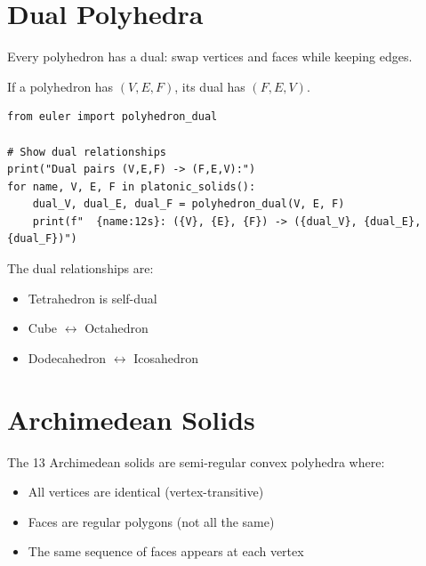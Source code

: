 \section{Dual Polyhedra}

Every polyhedron has a dual: swap vertices and faces while keeping edges.

\begin{theorem}
If a polyhedron has $(V, E, F)$, its dual has $(F, E, V)$.
\end{theorem}

\begin{lstlisting}[caption={Dual polyhedra}, label=lst:dual]
from euler import polyhedron_dual

# Show dual relationships
print("Dual pairs (V,E,F) -> (F,E,V):")
for name, V, E, F in platonic_solids():
    dual_V, dual_E, dual_F = polyhedron_dual(V, E, F)
    print(f"  {name:12s}: ({V}, {E}, {F}) -> ({dual_V}, {dual_E}, {dual_F})")
\end{lstlisting}

The dual relationships are:
\begin{itemize}
\item Tetrahedron is self-dual
\item Cube $\leftrightarrow$ Octahedron
\item Dodecahedron $\leftrightarrow$ Icosahedron
\end{itemize}

\section{Archimedean Solids}

The 13 Archimedean solids are semi-regular convex polyhedra where:
\begin{itemize}
\item All vertices are identical (vertex-transitive)
\item Faces are regular polygons (not all the same)
\item The same sequence of faces appears at each vertex
\end{itemize}

